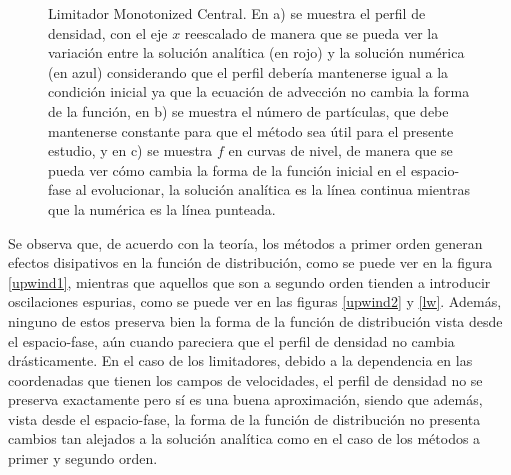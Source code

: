 \documentclass[11pt,twoside,openright,spanish]{report}
\numberwithin{equation}{chapter}
\numberwithin{figure}{chapter}
\numberwithin{table}{chapter}
\begin{document}
\begin{figure}[p]
	\caption{Limitador Monotonized Central. En a) se muestra el perfil de densidad, con el eje $x$ reescalado de manera que se pueda ver la variación entre la solución analítica (en rojo) y la solución numérica (en azul) considerando que el perfil debería mantenerse igual a la condición inicial ya que la ecuación de advección no cambia la forma de la función, en b) se muestra el número de partículas, que debe mantenerse constante para que el método sea útil para el presente estudio, y en c) se muestra $f$ en curvas de nivel, de manera que se pueda ver cómo cambia la forma de la función inicial en el espacio-fase al evolucionar, la solución analítica es la línea continua mientras que la numérica es la línea punteada.}
	\label{mc}
\end{figure}
\newpage

Se observa que, de acuerdo con la teoría, los métodos a primer orden generan efectos disipativos en la función de distribución, como se puede ver en la figura \ref{upwind1}, mientras que aquellos que son a segundo orden tienden a introducir oscilaciones espurias, como se puede ver en las figuras \ref{upwind2} y \ref{lw}. Además, ninguno de estos preserva bien la forma de la función de distribución vista desde el espacio-fase, aún cuando pareciera que el perfil de densidad no cambia drásticamente. En el caso de los limitadores, debido a la dependencia  en las coordenadas que tienen los campos de velocidades, el perfil de densidad no se preserva exactamente pero sí es una buena aproximación, siendo que además, vista desde el espacio-fase, la forma de la función de distribución no presenta cambios tan alejados a la solución analítica como en el caso de los métodos a primer y segundo orden.
\end{document}
